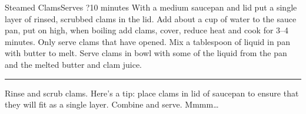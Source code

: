 \begin{recipe}{Steamed Clams}{Serves ?}{10 minutes}
\freeform With a medium saucepan and lid put a single layer of rinsed, scrubbed clams in the lid.  Add about a cup of water to the sauce pan, put on high, when boiling add clams, cover, reduce heat and cook for 3--4 minutes.  Only serve clams that have opened.  Mix a tablespoon of liquid in pan with butter to melt.  Serve clams in bowl with some of the liquid from the pan and the melted butter and clam juice.\\
\rule{\textwidth}{0.05pt}
Rinse and scrub clams.
\freeform Here's a tip: place clams in lid of saucepan to ensure that they will fit as a single layer.
Combine and serve. Mmmm\ldots
\end{recipe}
